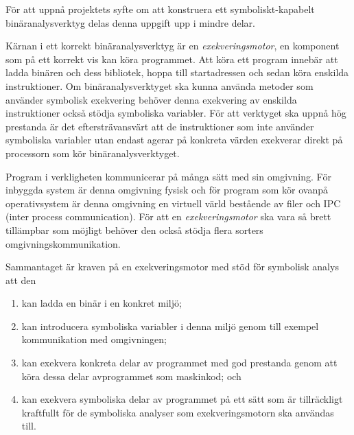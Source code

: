 


För att uppnå projektets syfte om att konstruera ett symboliskt-kapabelt
binäranalysverktyg delas denna uppgift upp i mindre delar.

Kärnan i ett korrekt binäranalysverktyg är en
\emph{exekveringsmotor}, en komponent som på ett korrekt vis kan köra
programmet. Att köra ett program innebär att ladda binären och dess bibliotek,
hoppa till startadressen och sedan köra enskilda instruktioner. Om
binäranalysverktyget ska kunna använda metoder som använder symbolisk exekvering
behöver denna exekvering av enskilda instruktioner också stödja symboliska
variabler. För att verktyget ska uppnå hög prestanda är det eftersträvansvärt
att de instruktioner som inte använder symboliska variabler utan endast agerar
på konkreta värden exekverar direkt på processorn som kör binäranalysverktyget.

Program i verkligheten kommunicerar på många sätt med sin omgivning. För
inbyggda system är denna omgivning fysisk och för program som kör ovanpå
operativsystem är denna omgivning en virtuell värld bestående av filer och IPC (inter
process communication). För att en \textit{exekveringsmotor} ska vara så
brett tillämpbar som möjligt behöver den också stödja flera sorters
omgivningskommunikation.

Sammantaget är kraven på en exekveringsmotor med stöd för symbolisk analys att den
\begin{enumerate}
	\item kan ladda en binär i en konkret miljö;
	\item kan introducera symboliska variabler i denna miljö genom till exempel kommunikation med omgivningen;
	\item kan exekvera konkreta delar av programmet med god prestanda genom att köra dessa delar
	avprogrammet som maskinkod; och
	\item kan exekvera symboliska delar av programmet på ett sätt som är tillräckligt kraftfullt för de
	symboliska analyser som exekveringsmotorn ska användas till.
\end{enumerate}

